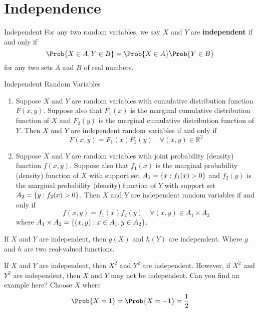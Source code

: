 \section{Independence}
\begin{Definition}{Independent}{}
    For any two random variables, we say $ X $ and $ Y $
    are \textbf{independent} if and only if
    \[ \Prob{X\in A,Y\in B}=\Prob{X\in A} \Prob{Y\in B} \]
    for any two sets $ A $ and $ B $ of real numbers.
\end{Definition}

\begin{Theorem}{Independent Random Variables}{}
    \begin{enumerate}[label=(\arabic*)]
        \item Suppose $ X $ and $ Y $
              are random variables with cumulative distribution
              function $ F(x,y) $. Suppose also that
              $ F_1(x) $ is the marginal cumulative distribution
              function of $ X $ and $ F_2(y) $
              is the marginal cumulative distribution function of $ Y $.
              Then $ X $ and $ Y $ are independent random variables if and only
              if
              \[ F(x,y)=F_1(x)F_2(y)\quad\forall(x,y)\in\mathbb{R}^2 \]
        \item Suppose $ X $ and $ Y $ are random variables with
              joint probability (density) function $ f(x,y) $.
              Suppose also that $ f_1(x) $ is the marginal
              probability (density) function of $ X $
              with support set $ A_1=\{x:f_1(x)>0\} $ and
              $ f_2(y) $ is the marginal
              probability (density) function of $ Y $
              with support set $ A_2=\{y:f_2(x)>0\} $. Then
              $ X $ and $ Y $ are independent random variables
              if and only if
              \[ f(x,y)=f_1(x)f_2(y)\quad \forall(x,y)\in A_1\times A_2 \]
              where $ A_1\times A_2=\{(x,y):x\in A_1,y\in A_2\} $.
    \end{enumerate}
\end{Theorem}

\begin{Theorem}{}{}
    If $ X $ and $ Y $ are independent,
    then $ g(X) $ and $ h(Y) $ are independent.
    Where $ g $ and $ h $ are two real-valued functions.
\end{Theorem}

\begin{Example}{}{}
    If $ X $ and $ Y $ are independent,
    then $ X^2 $ and $ Y^2 $ are independent. However,
    if $ X^2 $ and $ Y^2 $ are independent, then $ X $
    and $ Y $ may not be independent. Can you find an example here?
    Choose $ X $ where
    \[ \Prob{X=1}
        =\Prob{X=-1}=\frac{1}{2} \]
\end{Example}

